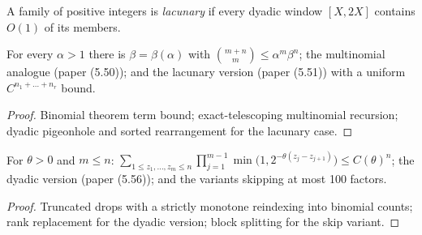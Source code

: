 \begin{definition}\label{D-5.11}
  \leanok
  A family of positive integers is \emph{lacunary} if every dyadic window
  \([X, 2X]\) contains \(O(1)\) of its members.
\end{definition}

\begin{lemma}\label{L-5.12}
  \leanok
  For every \(\alpha > 1\) there is \(\beta = \beta(\alpha)\) with
  \(\binom{m+n}{m} \le \alpha^m \beta^n\); the multinomial analogue
  (paper (5.50)); and the lacunary version (paper (5.51)) with a uniform
  \(C^{n_1+\dots+n_r}\) bound.
\end{lemma}
\begin{proof}\leanok
  Binomial theorem term bound; exact-telescoping multinomial recursion;
  dyadic pigeonhole and sorted rearrangement for the lacunary case.
\end{proof}

\begin{lemma}\label{L-5.13}
  \leanok
  For \(\theta > 0\) and \(m \le n\):
  \(\sum_{1\le z_1,\dots,z_m\le n}\prod_{j=1}^{m-1}
  \min\big(1, 2^{-\theta(z_j - z_{j+1})}\big) \le C(\theta)^n\); the
  dyadic version (paper (5.56)); and the variants skipping at most 100
  factors.
\end{lemma}
\begin{proof}\leanok
  Truncated drops with a strictly monotone reindexing into binomial
  counts; rank replacement for the dyadic version; block splitting for
  the skip variant.
\end{proof}
